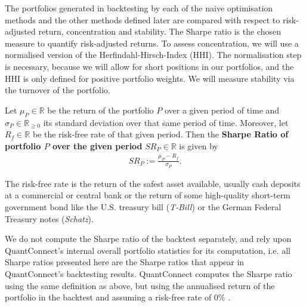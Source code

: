         The portfolios generated in backtesting by each of the naive optimisation methods and the other methods defined later are compared with respect to risk-adjusted return, concentration and stability. The Sharpe ratio is the chosen measure to quantify risk-adjusted returns. To assess concentration, we will use a normalised version of the Herfindahl-Hirsch-Index (HHI). The normalisation step is necessary, because we will allow for short positions in our portfolios, and the HHI is only defined for positive portfolio weights. We will measure stability via the turnover of the portfolio.
        
        \begin{definition} %
            Let $\mu_P \in \mathbb{R}$ be the return of the portfolio $P$ over a given period of time and $\sigma_P \in \mathbb{R}_{\geq 0}$ its standard deviation over that same period of time. Moreover, let $R_f \in \mathbb{R}$ be the risk-free rate of that given period. Then the \textbf{Sharpe Ratio of portfolio $P$ over the given period} $SR_P \in \mathbb{R}$ is given by
            \begin{align*}
                SR_P := \frac{\mu_P - R_f}{\sigma_P}.
            \end{align*}
            
            The risk-free rate is the return of the safest asset available, usually cash deposits at a commercial or central bank or the return of some high-quality short-term government bond like the U.S. treasury bill (\textit{T-Bill}) or the German Federal Treasury notes (\textit{Schatz}).
        \end{definition}
        
        \begin{remark}
            We do not compute the Sharpe ratio of the backtest separately, and rely upon QuantConnect's internal overall portfolio statistics for its computation, i.e. all Sharpe ratios presented here are the Sharpe ratios that appear in QuantConnect's backtesting results. QuantConnect computes the Sharpe ratio using the same definition as above, but using the annualised return of the portfolio in the backtest and assuming a risk-free rate of $0\%$ \cite{qcsharperatiocode}.
        \end{remark}
        
        
